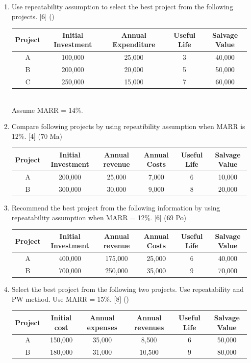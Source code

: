 \documentclass[12pt]{article}
\begin{document}
\begin{enumerate}
				\item Use repeatability assumption to select the best project from the following projects. \hfill [6] ()
				\begin{tabular}{|c|c|c|c|c|}
					\hline
					Project & Initial Investment & Annual Expenditure & Useful Life & Salvage Value \\ \hline
					A & 100,000 & 25,000 & 3 & 40,000 \\ \hline
					B & 200,000 & 20,000 & 5 & 50,000 \\ \hline
					C & 250,000 & 15,000 & 7 & 60,000 \\ \hline
				\end{tabular}\\
				Assume MARR = 14\%.
				
				\item Compare following projects by using  repeatibility assumption when MARR is 12\%. \hfill [4] (70 Ma)\\
				\begin{tabular}{|c|c|c|c|c|c|}
					\hline
					Project & Initial Investment & Annual revenue & Annual Costs & Useful Life & Salvage Value \\ \hline
					A & 200,000 & 25,000 & 7,000 & 6 & 10,000 \\ \hline
					B & 300,000 & 30,000 & 9,000 & 8 & 20,000 \\ \hline
				\end{tabular}
				
				\item Recommend the best project from the following information by using repeatability assumption when MARR = 12\%. \hfill [6] (69 Po)\\
				\begin{tabular}{|c|c|c|c|c|c|}
					\hline
					Project & Initial Investment & Annual revenue & Annual Costs & Useful Life & Salvage Value \\ \hline
					A & 400,000 & 175,000 & 25,000 & 6 & 40,000 \\ \hline
					B & 700,000 & 250,000 & 35,000 & 9 & 70,000 \\ \hline
				\end{tabular}
				
				\item Select the best project from the following two projects. Use repeatability and PW method. Use MARR = 15\%. \hfill [8] () \\
				\begin{tabular}{|c|c|c|c|c|c|}
					\hline
					Project & Initial cost & Annual expenses & Annual revenues & Useful Life & Salvage Value \\ \hline
					A & 150,000 & 35,000 & 8,500 & 6 & 50,000 \\ \hline
					B & 180,000 & 31,000 & 10,500 & 9 & 80,000 \\ \hline
				\end{tabular}
			\end{enumerate}
	
\end{document}

